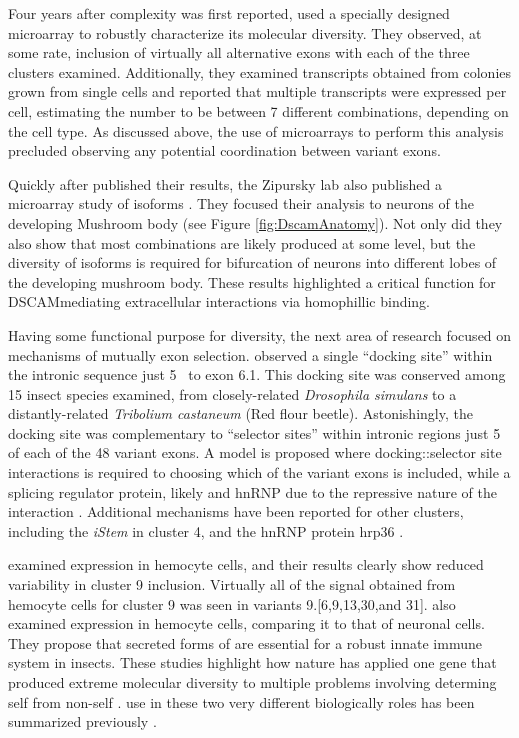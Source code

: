     Four years after \dscam{} complexity was first reported, \citep{Neves2004} used a specially designed microarray to robustly characterize its molecular diversity. They observed, at some rate, inclusion of virtually all alternative exons with each of the three clusters examined. Additionally, they examined \dscam{} transcripts obtained from colonies grown from single cells and reported that multiple \dscam{} transcripts were expressed per cell, estimating the number to be between 7 different combinations, depending on the cell type. As discussed above, the use of microarrays to perform this analysis precluded observing any potential coordination between variant exons.

    Quickly after \citet{Neves2004} published their results, the Zipursky lab also published a microarray study of \dscam{} isoforms \citep{Zhan2004}. They focused their analysis to neurons of the developing Mushroom body (see Figure \ref{fig:DscamAnatomy}). Not only did they also show that most \dscam{} combinations are likely produced at some level, but the diversity of isoforms is required for bifurcation of neurons into different lobes of the developing mushroom body. These results highlighted a critical function for DSCAM\textendash mediating extracellular interactions via homophillic binding.

    Having some functional purpose for \dscam{} diversity, the next area of research focused on mechanisms of mutually exon selection. \citet{Graveley2005b} observed a single ``docking site'' within the intronic sequence just 5\textprime~ to exon 6.1. This docking site was conserved among 15 insect species examined, from closely-related \textit{Drosophila simulans} to a distantly-related \textit{Tribolium castaneum} (Red flour beetle). Astonishingly, the docking site was complementary to ``selector sites'' within intronic regions just 5\textprime~ of each of the 48 variant exons.  A model is proposed where docking::selector site interactions is required to choosing which of the variant exons is included, while a splicing regulator protein, likely and hnRNP due to the repressive nature of the interaction \citep{Graveley2000}. Additional mechanisms have been reported for other clusters, including the \textit{iStem} \citep{Kreahling2005} in cluster 4, and the hnRNP protein hrp36 \citep{Olson2007}.

    \citep{Neves2004} examined \dscam{} expression in hemocyte cells, and their results clearly show reduced variability in cluster 9 inclusion. Virtually all of the signal obtained from hemocyte cells for cluster 9 was seen in variants 9.[6,9,13,30,and 31]. \citep{Watson2005} also examined \dscam{} expression in hemocyte cells, comparing it to that of neuronal cells. They propose that secreted forms of \dscam{} are essential for a robust innate immune system in insects. These studies highlight how nature has applied one gene that produced extreme molecular diversity to multiple problems involving determing self from non-self \citep{Shi2012a, Hattori2008}. \dscam{} use in these two very different biologically roles has been summarized previously \citep{Hemani2012}. 


